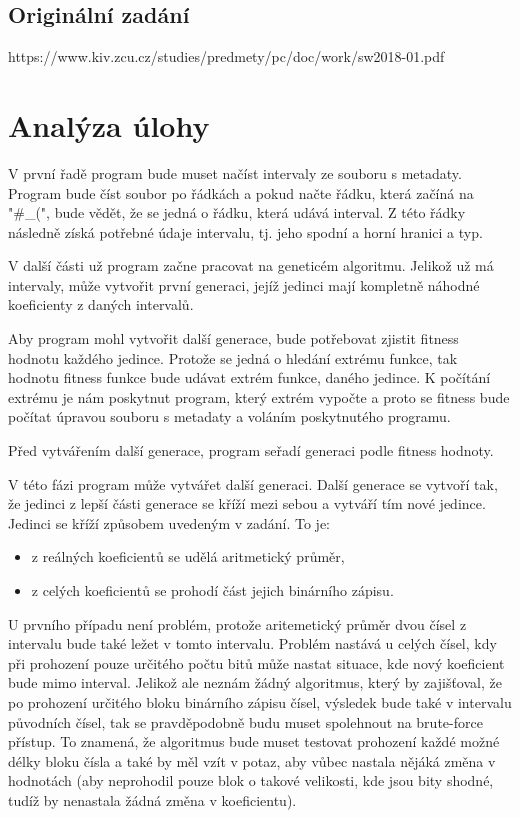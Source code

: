 \documentclass[11pt, a4paper]{article}
\begin{document}
\subsection{Originální zadání}
https://www.kiv.zcu.cz/studies/predmety/pc/doc/work/sw2018-01.pdf
\newpage
%
%
\section{Analýza úlohy}
V první řadě program bude muset načíst intervaly ze souboru s metadaty. Program bude číst soubor po řádkách a pokud načte řádku, která začíná na "\#\_(", bude vědět, že se jedná o řádku, která udává interval. Z této řádky následně získá potřebné údaje intervalu, tj. jeho spodní a horní hranici a typ.\par
V další části už program začne pracovat na geneticém algoritmu. Jelikož už má intervaly, může vytvořit první generaci, jejíž jedinci mají kompletně náhodné koeficienty z daných intervalů.\par
Aby program mohl vytvořit další generace, bude potřebovat zjistit fitness hodnotu každého jedince. Protože se jedná o hledání extrému funkce, tak hodnotu fitness funkce bude udávat extrém funkce, daného jedince. K počítání extrému je nám poskytnut program, který extrém vypočte a proto se fitness bude počítat úpravou souboru s metadaty a voláním poskytnutého programu.\par
Před vytvářením další generace, program seřadí generaci podle fitness hodnoty.\par
V této fázi program může vytvářet další generaci. Další generace se vytvoří tak, že jedinci z lepší části generace se kříží mezi sebou a vytváří tím nové jedince. Jedinci se kříží způsobem uvedeným v zadání. To je:
\begin{itemize}
  \item z reálných koeficientů se udělá aritmetický průměr,
  \item z celých koeficientů se prohodí část jejich binárního zápisu.
\end{itemize}
U prvního případu není problém, protože aritemetický průměr dvou čísel z intervalu bude také ležet v tomto intervalu. Problém nastává u celých čísel, kdy při prohození pouze určitého počtu bitů může nastat situace, kde nový koeficient bude mimo interval. Jelikož ale neznám žádný algoritmus, který by zajišťoval, že po prohození určitého bloku binárního zápisu čísel, výsledek bude také v intervalu původních čísel, tak se pravděpodobně budu muset spolehnout na brute-force přístup. To znamená, že algoritmus bude muset testovat prohození každé možné délky bloku čísla a také by měl vzít v potaz, aby vůbec nastala nějáká změna v hodnotách (aby neprohodil pouze blok o takové velikosti, kde jsou bity shodné, tudíž by nenastala žádná změna v koeficientu).\par
\end{document}
